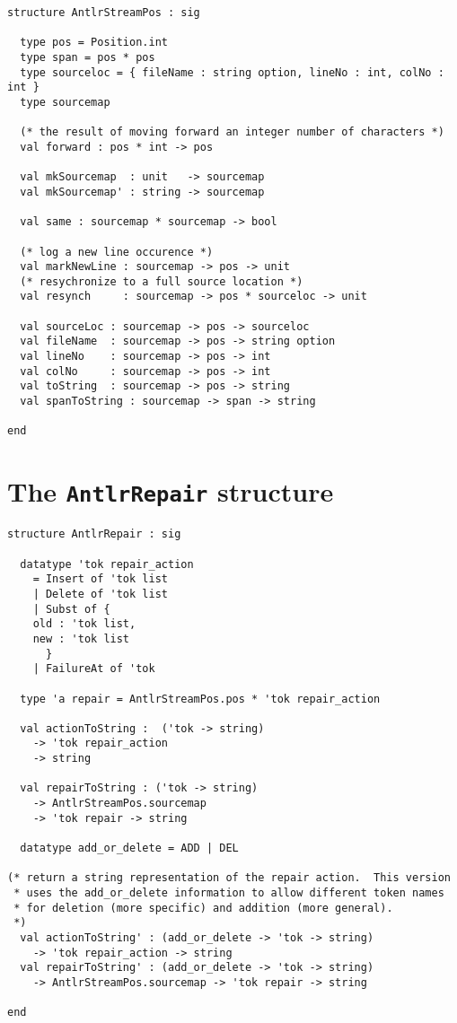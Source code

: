 \begin{lstlisting}
structure AntlrStreamPos : sig

  type pos = Position.int
  type span = pos * pos
  type sourceloc = { fileName : string option, lineNo : int, colNo : int }
  type sourcemap

  (* the result of moving forward an integer number of characters *)
  val forward : pos * int -> pos

  val mkSourcemap  : unit   -> sourcemap
  val mkSourcemap' : string -> sourcemap

  val same : sourcemap * sourcemap -> bool

  (* log a new line occurence *)
  val markNewLine : sourcemap -> pos -> unit
  (* resychronize to a full source location *)
  val resynch     : sourcemap -> pos * sourceloc -> unit

  val sourceLoc : sourcemap -> pos -> sourceloc
  val fileName  : sourcemap -> pos -> string option
  val lineNo    : sourcemap -> pos -> int
  val colNo     : sourcemap -> pos -> int
  val toString  : sourcemap -> pos -> string
  val spanToString : sourcemap -> span -> string

end
\end{lstlisting}%


\section{The {\tt AntlrRepair} structure}

\begin{lstlisting}
structure AntlrRepair : sig

  datatype 'tok repair_action
    = Insert of 'tok list
    | Delete of 'tok list
    | Subst of {
	old : 'tok list,
	new : 'tok list
      }
    | FailureAt of 'tok
  
  type 'a repair = AntlrStreamPos.pos * 'tok repair_action
  
  val actionToString :  ('tok -> string)
	-> 'tok repair_action
	-> string
    
  val repairToString : ('tok -> string)
	-> AntlrStreamPos.sourcemap
	-> 'tok repair -> string

  datatype add_or_delete = ADD | DEL

(* return a string representation of the repair action.  This version
 * uses the add_or_delete information to allow different token names
 * for deletion (more specific) and addition (more general).
 *)
  val actionToString' : (add_or_delete -> 'tok -> string)
	-> 'tok repair_action -> string
  val repairToString' : (add_or_delete -> 'tok -> string)
	-> AntlrStreamPos.sourcemap -> 'tok repair -> string

end
\end{lstlisting}%
